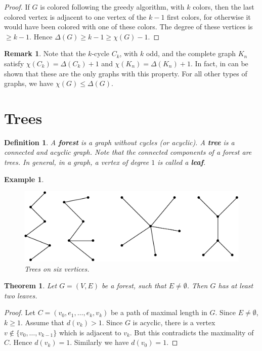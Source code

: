 \documentclass[12pt,a4paper]{article}
\newtheorem{thm}{Theorem}[section]
\newtheorem{defn}{Definition}[section]
\newtheorem{exmp}{Example}[section]
\theoremstyle{definition}
\newtheorem{rem}{Remark}[section]
\begin{document}
\begin{proof}
If $G$ is colored following the greedy algorithm, with $k$ colors, then the last colored vertex is adjacent to one vertex of the $k-1$ first colors, for otherwise it would have been colored with one of these colors. The degree of these vertices is $\geq k-1$. Hence $\Delta(G) \geq k-1 \geq \chi(G)-1$. 
\end{proof}
\begin{rem}
Note that the $k$-cycle $C_k$, with $k$ odd, and the complete graph $K_n$ satisfy $\chi(C_k)=\Delta(C_k)+1$ and $\chi(K_n)=\Delta(K_n)+1$. In fact,  in can be shown that these are the only graphs with this property. For all other types of graphs, we have $\chi(G) \leq \Delta(G)$. 
\end{rem}
\section{Trees}
\begin{defn} A \textbf{forest} is a graph without cycles (or acyclic). A \textbf{tree} is a connected and acyclic graph. Note that the connected components of a forest are trees. In general, in a graph, a vertex of degree $1$ is called a\textbf{ leaf}.
\end{defn}
\begin{exmp} \
\begin{figure}[hbtp]
\centering
\includegraphics[scale=.7]{images/graph27.pdf}
\caption{Trees on six vertices.}
\end{figure}
\end{exmp}
\begin{thm} Let $G=(V,E)$ be a forest, such that $E \neq \emptyset$. Then $G$ has at least two leaves. 
\end{thm}
\begin{proof}
Let $C=(v_0,e_1, \dots , e_k,v_k)$ be a path of maximal length in $G$. Since $E \neq \emptyset$, $k \geq 1$. Assume that $d(v_k) >1$. Since $G$ is acyclic, there is a vertex $v \notin \{ v_0, \dots , v_{k-1}\}$ which is adjacent to $v_k$. But this contradicts the maximality of $C$. Hence $d(v_k)=1$. Similarly we have $d(v_0)=1$. 
\end{proof}
\end{document}
